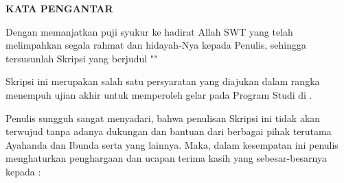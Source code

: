 
\clearpage
{}
{}
\begin{center}
    \textbf{\large KATA PENGANTAR}\\[3em]
\end{center}

Dengan memanjatkan puji syukur ke hadirat Allah SWT yang telah melimpahkan segala rahmat dan hidayah-Nya kepada Penulis, sehingga tersusunlah Skripsi yang berjudul "\textbf{\judulid}"

Skripsi ini merupakan salah satu persyaratan yang diajukan dalam rangka menempuh ujian akhir untuk memperoleh gelar {\gelar} {\gelarsingkat} pada Program Studi {\prodi} di {\fakultas} {\universitas}.

Penulis sungguh sangat menyadari, bahwa penulisan Skripsi ini tidak akan terwujud tanpa adanya dukungan dan bantuan dari berbagai pihak terutama Ayahanda dan Ibunda serta yang lainnya. Maka, dalam kesempatan ini penulis menghaturkan penghargaan dan ucapan terima kasih yang sebesar-besarnya kepada :

